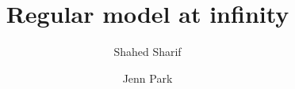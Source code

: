 \documentclass{article}
\begin{document}
\title{Regular model at infinity}
\author{Shahed Sharif \and Jenn Park}
\maketitle




\end{document}
